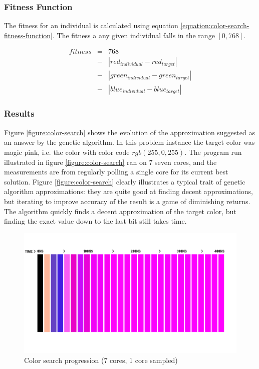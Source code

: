 \subsubsection{Fitness Function}

The fitness for an individual is calculated using equation \vref{equation:color-search-fitness-function}.
The fitness a any given individual falls in the range $ [0, 768] $.

\begin{eqnarray}
\nonumber
fitness & = & 768 \\
\nonumber
        & - & |red_{individual} - red_{target}| \\
\nonumber
        & - & |green_{individual} - green_{target}| \\
        & - & |blue_{individual} - blue_{target}|
\label{equation:color-search-fitness-function}
\end{eqnarray}

\subsubsection{Results}

Figure \vref{figure:color-search} shows the evolution of the approximation suggested as an answer by the genetic algorithm.
In this problem instance the target color was magic pink, i.e. the color with color code $ rgb(255, 0, 255) $.
The program run illustrated in figure \vref{figure:color-search} ran on 7 seven cores, and the measurements are from regularly polling a single core for its current best solution.
Figure \vref{figure:color-search} clearly illustrates a typical trait of genetic algorithm approximations: they are quite good at finding decent approximations, but iterating to improve accuracy of the result is a game of diminishing returns.
The algorithm quickly finds a decent approximation of the target color, but finding the exact value down to the last bit still takes time.

\begin{figure}[H]
    \begin{center}
        \includegraphics[width=\textwidth]{fig/color-search}
    \caption{Color search progression (7 cores, 1 core sampled)}
    \label{figure:color-search}
    \end{center}
\end{figure}

